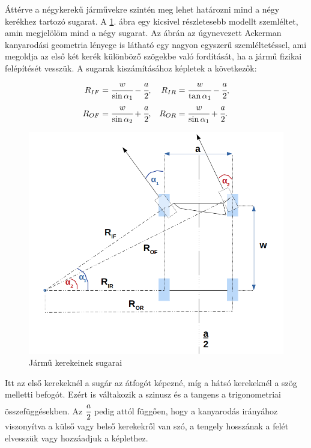
Áttérve a négykerekű járművekre szintén meg lehet határozni mind a négy kerékhez tartozó sugarat. A \ref{fig:each_wheel_radius}. ábra egy kicsivel részletesebb modellt szemléltet, amin megjelölöm mind a négy sugarat. Az ábrán az úgynevezett Ackerman kanyarodási geometria lényege is látható egy nagyon egyszerű szemléltetéssel, ami megoldja az első két kerék különböző szögekbe való fordítását, ha a jármű fizikai felépítését vesszük. A sugarak kiszámításához képletek a következők:
\begin{align*}
R_{IF} &=  \cfrac{w}{\sin\alpha_1} - \cfrac{a}{2}, &
R_{IR} &=  \cfrac{w}{\tan\alpha_1} - \cfrac{a}{2}, \\
R_{OF} &=  \cfrac{w}{\sin\alpha_2} + \cfrac{a}{2}, &
R_{OR} &=  \cfrac{w}{\sin\alpha_1} + \cfrac{a}{2}. \\
\end{align*}

\begin{figure}[h!]
\centering
\includegraphics[scale=0.45]{images/each_wheel_radius.png}
\caption{Jármű kerekeinek sugarai}
\label{fig:each_wheel_radius}
\end{figure}

Itt az első kerekeknél a sugár az átfogót képezné, míg a hátsó kerekeknél a szög melletti befogót. Ezért is váltakozik a szinusz és a tangens a trigonometriai összefüggésekben. Az $\cfrac{a}{2}$ pedig attól függően, hogy a kanyarodás irányához viszonyítva a külső vagy belső kerekekről van szó, a tengely hosszának a felét elvesszük vagy hozzáadjuk a képlethez. 

